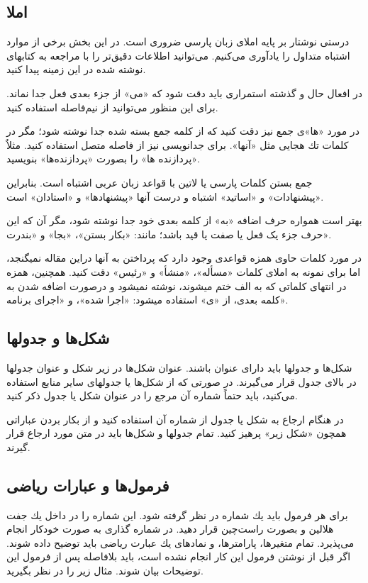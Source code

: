 \documentclass{CSICC2020}
\begin{document}
\subsection{املا}
درستی نوشتار بر پایه املای زبان پارسی ضروری است. در این بخش برخی از موارد اشتباه متداول را یادآوری می‌كنیم. می‌توانید اطلاعات دقیق‌تر را با مراجعه به كتاب­های نوشته شده در این زمینه پیدا كنید.

در افعال حال و گذشته استمراری باید دقت شود كه «می» از جزء بعدی فعل جدا نماند. برای این منظور می‌توانید از نیم‌فاصله استفاده کنید.

در مورد «ها»ی جمع نیز دقت كنید كه از كلمه جمع بسته شده جدا نوشته شود؛ مگر در كلمات تك هجایی مثل «آنها». برای جدانویسی نیز از فاصله متصل استفاده كنید. مثلاٌ «پردازنده ها» را بصورت «پردازنده‌­ها» بنویسید.

جمع بستن كلمات پارسی یا لاتین با قواعد زبان عربی اشتباه است. بنابراین «پیشنهادات» و «اساتید» اشتباه و درست آنها «پیشنهادها» و «استادان» است.

بهتر است همواره حرف اضافه «به» از کلمه بعدی خود جدا نوشته شود، مگر آن که این حرف جزء یک فعل یا صفت یا قید باشد؛ مانند: «بکار بستن»، «بجا» و «بندرت».

در مورد کلمات حاوی همزه قواعدی وجود دارد که پرداختن به آنها دراین مقاله نمی­گنجد، اما برای نمونه به املای کلمات «مسأله»، «منشأ» و «رئیس» دقت كنید. همچنین، همزه در انتهای کلماتی که به الف ختم می­شوند، نوشته نمی­شود و درصورت اضافه شدن به کلمه بعدی، از «ی» استفاده می­شود: «اجرا شده»، و «اجرای برنامه».


\subsection{شكل‌ها و جدول­ها}
شكل‌ها و جدول­ها باید دارای عنوان باشند. عنوان شكل‌ها در زیر شكل و عنوان جدول­ها در بالای جدول قرار می‌گیرند. در صورتی كه از شكل‌ها یا جدول­های سایر منابع استفاده می‌كنید، باید حتماً شماره آن مرجع را در عنوان شكل یا جدول ذكر كنید.

در هنگام ارجاع به شكل یا جدول از شماره آن استفاده كنید و از بكار بردن عباراتی همچون «شكل زیر» پرهیز كنید. تمام جدول­ها و شكل‌ها باید در متن مورد ارجاع قرار گیرند. 


\subsection{ فرمول‌ها و عبارات ریاضی}
برای هر فرمول باید یك شماره در نظر گرفته شود. این شماره را در داخل یك جفت هلالین و بصورت راست‌چین قرار دهید.  در   \lr{\LaTeX}  شماره گذاری به صورت خودکار انجام می‌پذیرد. تمام متغیرها، پارامترها، و نمادهای یك عبارت ریاضی باید توضیح داده شوند. اگر قبل از نوشتن فرمول این كار انجام نشده است، باید بلافاصله پس از فرمول این توضیحات بیان شوند. مثال زیر را در نظر بگیرید.
\end{document}
